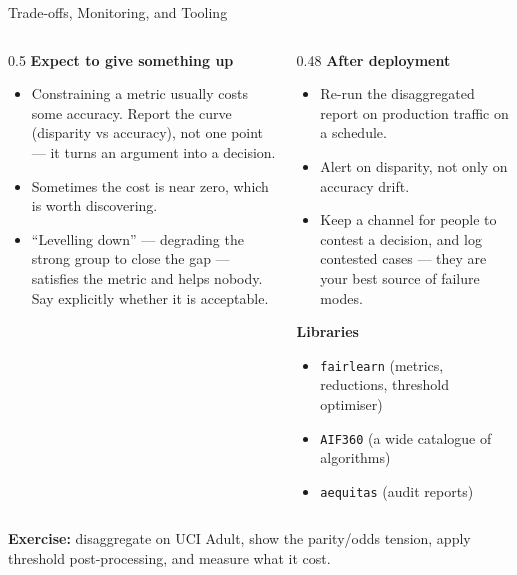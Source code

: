 \begin{frame}{Trade-offs, Monitoring, and Tooling}
    \begin{columns}[T]
        \begin{column}{0.5\textwidth}
            \textbf{Expect to give something up}
            \begin{itemize}\small
                \setlength\itemsep{0.3em}
                \item Constraining a metric usually costs some accuracy. Report the curve
                      (disparity vs accuracy), not one point --- it turns an argument into a
                      decision.
                \item Sometimes the cost is near zero, which is worth discovering.
                \item ``Levelling down'' --- degrading the strong group to close the gap ---
                      satisfies the metric and helps nobody. Say explicitly whether it is acceptable.
            \end{itemize}
        \end{column}
        \begin{column}{0.48\textwidth}
            \textbf{After deployment}
            \begin{itemize}\small
                \setlength\itemsep{0.3em}
                \item Re-run the disaggregated report on production traffic on a schedule.
                \item Alert on disparity, not only on accuracy drift.
                \item Keep a channel for people to contest a decision, and log contested cases ---
                      they are your best source of failure modes.
            \end{itemize}
            \vspace{0.5em}
            \textbf{Libraries}
            \begin{itemize}\small
                \item \texttt{fairlearn} (metrics, reductions, threshold optimiser)
                \item \texttt{AIF360} (a wide catalogue of algorithms)
                \item \texttt{aequitas} (audit reports)
            \end{itemize}
        \end{column}
    \end{columns}

    \vspace{0.7em}
    \begin{block}{}
        \centering
        \small \textbf{Exercise:} disaggregate on UCI Adult, show the parity/odds tension, apply
        threshold post-processing, and measure what it cost.
    \end{block}
\end{frame}
